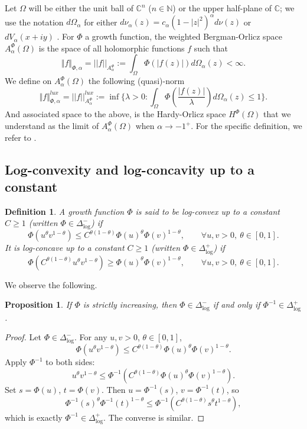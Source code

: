 \documentclass[12pt]{amsart}
\newtheorem{proposition}{Proposition}
\newtheorem{definition}{Definition}
\begin{document}
Let $\Omega$ will be either the unit ball of $\mathbb{C}^n$ ($n\in\mathbb{N}$) or the upper half-plane of $\mathbb{C}$; we use the notation $d\Omega_\alpha$ for either $d\nu_{\alpha}(z)=c_{\alpha}(1-|z|^2)^{\alpha}d\nu(z)$ or $dV_\alpha(x+iy)$ . For $\Phi$ a growth function, the weighted Bergman-Orlicz space $A_\alpha^{\Phi}(\Omega)$ is the space of all holomorphic functions $f$ such that
$$\Vert f\Vert_{\Phi,\alpha}=||f||_{A_\alpha^{\Phi}}:=\int_{\Omega}\Phi(|f(z)|)d\Omega_{\alpha}(z)<\infty.$$
We define on $A_\alpha^{\Phi}(\Omega)$ the following (quasi)-norm
\begin{equation}\label{BergOrdef1}
\Vert f\Vert^{lux}_{\Phi,\alpha}=||f||^{lux}_{A_\alpha^{\Phi}}:=\inf\{\lambda>0: \int_{\Omega}\Phi\left(\frac{|f(z)|}{\lambda}\right)d\Omega_\alpha(z)\le 1\}.
\end{equation}
And associated space to the above, is the Hardy-Orlicz space $H^\Phi(\Omega)$ that we understand as the limit of $A_\alpha^\Phi(\Omega)$ when $\alpha\to -1^+$. For the specific definition, we refer to \cite{DieSehba2023}. 
\subsection{Log-convexity and log-concavity up to a constant}

\begin{definition}\label{def:logconv}
A growth function $\Phi$ is said to be log-convex up to a constant $C\ge 1$ (written $\Phi\in\Delta_{\log}^-$) if
\[
\Phi(u^\theta v^{1-\theta}) \le C^{\theta(1-\theta)} \Phi(u)^\theta \Phi(v)^{1-\theta}, \qquad \forall u,v>0,\ \theta\in[0,1].
\]
It is log-concave up to a constant $C\ge 1$ (written $\Phi\in\Delta_{\log}^+$) if
\[
\Phi(C^{\theta(1-\theta)} u^\theta v^{1-\theta}) \ge \Phi(u)^\theta \Phi(v)^{1-\theta}, \qquad \forall u,v>0,\ \theta\in[0,1].
\]
\end{definition}
We observe the following.
\begin{proposition}\label{prop:dualityconv}
If $\Phi$ is strictly increasing, then $\Phi \in \Delta_{\log}^-$ if and only if $\Phi^{-1} \in \Delta_{\log}^+$.
\end{proposition}
\begin{proof}
Let $\Phi\in\Delta_{\log}^-$. For any $u,v>0$, $\theta\in[0,1]$,
\[
\Phi(u^\theta v^{1-\theta}) \le C^{\theta(1-\theta)} \Phi(u)^\theta \Phi(v)^{1-\theta}.
\]
Apply $\Phi^{-1}$ to both sides:
\[
u^\theta v^{1-\theta} \le \Phi^{-1}\left( C^{\theta(1-\theta)} \Phi(u)^\theta \Phi(v)^{1-\theta} \right).
\]
Set $s=\Phi(u)$, $t=\Phi(v)$. Then $u=\Phi^{-1}(s)$, $v=\Phi^{-1}(t)$, so
\[
\Phi^{-1}(s)^\theta \Phi^{-1}(t)^{1-\theta} \le \Phi^{-1}\left( C^{\theta(1-\theta)} s^\theta t^{1-\theta} \right),
\]
which is exactly $\Phi^{-1}\in\Delta_{\log}^+$.
The converse is similar.
\end{proof}
\end{document}

